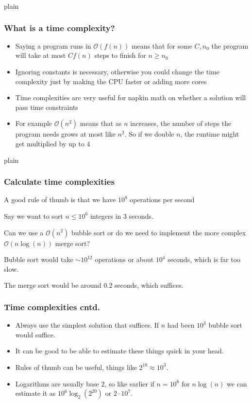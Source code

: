 \documentclass{beamer}
\begin{document}
\begin{frame}{plain}
    \frametitle{What is a time complexity?}
    \begin{itemize}
        \item Saying a program runs in $\mathcal{O}(f(n))$ means that for some $C, n_0$ the program will take at most $C f(n)$ steps to finish for $n \geq n_0$
        \item Ignoring constants is necessary, otherwise you could change the time complexity just by making the CPU faster or adding more cores
        \item Time complexities are very useful for napkin math on whether a solution will pass time constraints
        \item For example $\mathcal{O}(n^2)$ means that as $n$ increases, the number of steps the program needs grows at most like $n^2$. So if we double $n$, the runtime might get multiplied by up to $4$
    \end{itemize}
\end{frame}

\begin{frame}{plain}
    \frametitle{Calculate time complexities}
    \begin{itemize}
        \item A good rule of thumb is that we have $10^8$ operations per second
         {
            \item Say we want to sort $n \leq 10^6$ integers in 3 seconds.
            \item Can we use a $\mathcal{O}(n^2)$ bubble sort or do we need to implement the more complex $\mathcal{O}(n\log(n))$ merge sort?
             {
                \item Bubble sort would take $\sim 10^{12}$ operations or about $10^4$ seconds, which is far too slow.
                \item The merge sort would be around $0.2$ seconds, which suffices.
            }
        }
    \end{itemize}
\end{frame}

\begin{frame}[plain]
    \frametitle{Time complexities cntd.}
    \begin{itemize}
        \item Always use the simplest solution that suffices. If $n$ had been $10^3$ bubble sort would suffice.
        \item It can be good to be able to estimate these things quick in your head.
        \item Rules of thumb can be useful, things like $2^{10} \approx 10^3$.
        \item Logarithms are usually base $2$, so like earlier if $n = 10^6$ for $n\log(n)$ we can estimate it as $10^6 \log_2(2^{20})$ or $2 \cdot 10^7$.
    \end{itemize}
\end{frame}
\end{document}
